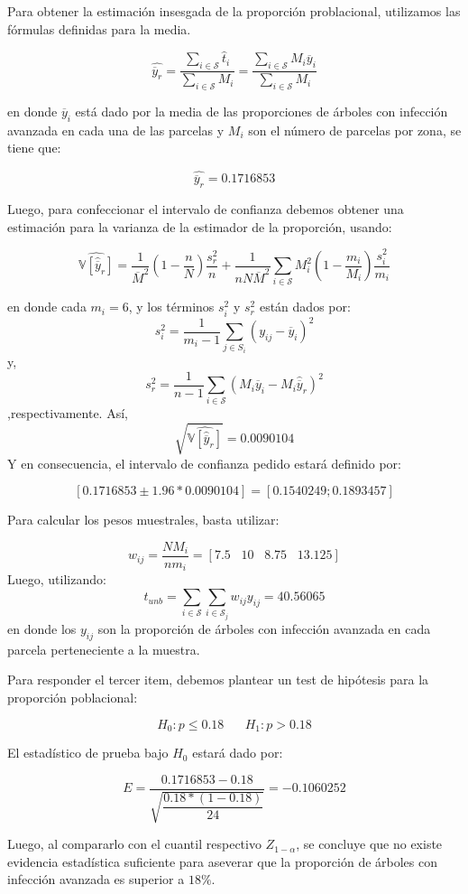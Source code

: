 \begin{solution}
Para obtener la estimación insesgada de la proporción problacional, utilizamos las fórmulas definidas para la media.

$$\widehat{\overline{y}_r}=\dfrac{\sum_{i\in \mathcal{S}}\hat{t}_i}{\sum_{i\in \mathcal{S}}M_i}=\dfrac{\sum_{i\in \mathcal{S}}M_i \overline{y}_i}{\sum_{i\in \mathcal{S}}M_i}$$

en donde $\overline{y}_i$ está dado por la media de las proporciones de árboles con infección avanzada en cada una de las parcelas y $M_i$ son el número de parcelas por zona, se tiene que:

$$\widehat{\overline{y}_r}=0.1716853$$

Luego, para confeccionar el intervalo de confianza debemos obtener una estimación para la varianza de la estimador de la proporción, usando:

$$\widehat{\mathbb{V}[ \hat{\overline{y}}_{r} ]}=\dfrac{1}{\overline{M}^2}\left( 1- \dfrac{n}{N}\right) \dfrac{s_{r}^{2}}{n}+\dfrac{1}{nN\overline{M}^2}\sum_{i\in \mathcal{S}} M_{i}^2 \left( 1 -\dfrac{m_i}{M_i}\right)\dfrac{s_{i}^{2}}{m_i} $$

en donde cada $m_i=6$, y los términos $s_{i}^2$ y $s_{r}^{2}$ están dados por:
$$\displaystyle s_{i}^{2}=\dfrac{1}{m_i-1}\sum_{j\in S_i} \left( y_{ij} - \overline{y}_i\right)^2$$
y, 
$$s_{r}^2=\dfrac{1}{n-1}\sum_{i\in \mathcal{S}} (M_i\overline{y}_i-M_i\hat{\overline{y}}_r)^2$$
,respectivamente. Así, 
$$\sqrt{\widehat{\mathbb{V}[ \hat{\overline{y}}_{r} ]}}=0.0090104$$
Y en consecuencia, el intervalo de confianza pedido estará definido por:

$$\left[0.1716853\pm 1.96 *0.0090104\right]= \left[0.1540249;0.1893457\right]$$

Para calcular los pesos muestrales, basta utilizar:

$$w_{ij}=\dfrac{NM_i}{nm_i}=\left[7.5\hspace{10pt} 10\hspace{10pt} 8.75\hspace{10pt} 13.125\right]$$
Luego, utilizando:
$$\widehat{t}_{unb}= \sum_{i\in \mathcal{S}} \sum_{i\in \mathcal{S}_j} w_{ij}y_{ij}=40.56065$$
en donde los $y_{ij}$ son la proporción de árboles con infección avanzada en cada parcela perteneciente a la muestra.

Para responder el tercer item, debemos plantear un test de hipótesis para la proporción poblacional:

$$H_0: p  \leq 0.18 \hspace{20pt} H_1: p > 0.18$$

El estadístico de prueba bajo $H_0$ estará dado por:

$$E=\dfrac{0.1716853-0.18}{\sqrt{\dfrac{0.18*(1-0.18)}{24}}}=-0.1060252$$

Luego, al compararlo con el cuantil respectivo $Z_{1-\alpha}$, se concluye que no existe evidencia estadística suficiente para aseverar que la proporción de árboles con infección avanzada es superior a $18\%$.
\end{solution}